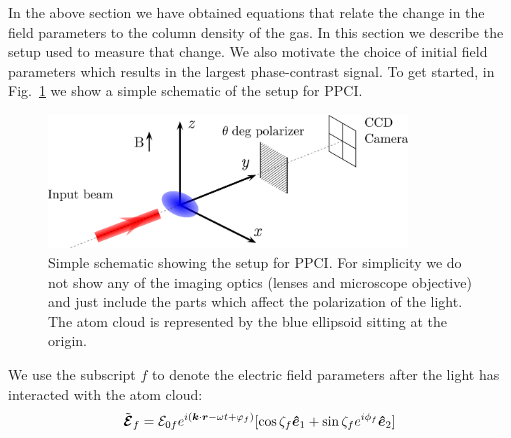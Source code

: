 In the above section we have obtained equations that relate the change in the
field parameters to the column density of the gas.   In this section we
describe the setup used to measure that change.  We also motivate the choice of
initial field parameters which results in the largest phase-contrast signal.
To get started,  in Fig.~\ref{fig:phc-setup} we show a simple schematic of the
setup for PPCI.
\begin{figure}
\centering
\includegraphics[width=0.85\textwidth]{../figures/phasecon/phase_contrast_02.png}
\caption[Schematic for polarization phase-contrast imaging]{Simple schematic
showing the setup for PPCI.  For simplicity we do not show any of the imaging
optics (lenses and microscope objective) and just include the parts which
affect the polarization of the light.  The atom cloud is represented by the
blue ellipsoid sitting at the origin.  }
\label{fig:phc-setup}
\end{figure}

We use the subscript $f$ to denote the electric field parameters after the
light has interacted with the atom cloud: 
\begin{equation}
 \tilde{\bm{\mathcal{E}}}_{f}= 
      \mathcal{E}_{0f} e^{i(\bm{k}\cdot\bm{r} - \omega t + \varphi_{f} )} 
     [ \cos\zeta_{f} \bm{\hat{e}}_{1} 
   +   \sin\zeta_{f} e^{i\phi_{f}} \bm{\hat{e}}_{2} ]
\end{equation}


